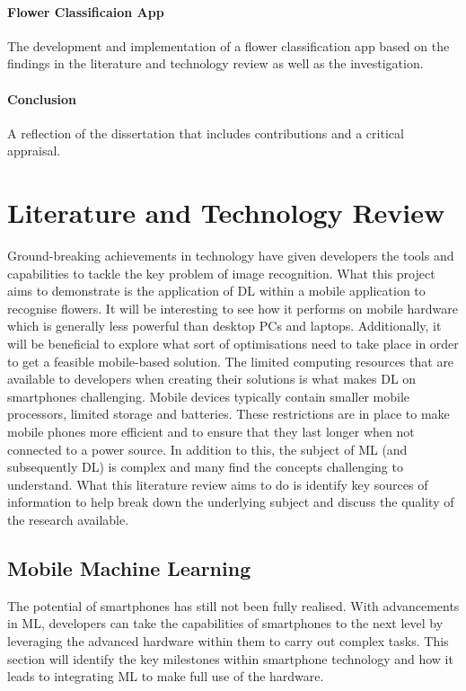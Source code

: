 \documentclass[12pt,a4paper]{report}
\begin{document}
\subsubsection*{Flower Classificaion App}
The development and implementation of a flower classification app based on the findings in the literature and 
technology review as well as the investigation.

\subsubsection*{Conclusion}
A reflection of the dissertation that includes contributions and a critical appraisal.

\clearpage
\chapter{Literature and Technology Review}

Ground-breaking achievements in technology have given developers the tools and capabilities to
tackle the key problem of image recognition. What this project aims to demonstrate is the application of DL 
within a mobile application to recognise flowers. It will be interesting to see how it performs on mobile 
hardware which is generally less powerful than desktop PCs and laptops. Additionally, it will be beneficial to explore 
what sort 
of optimisations need to take place in order to get a feasible mobile-based solution. The limited computing resources 
that are available to developers when creating their solutions is what makes DL on smartphones challenging. 
Mobile devices typically 
contain smaller mobile processors, limited storage and batteries. These restrictions are in place to 
make mobile phones more efficient and to ensure that they last longer when not connected to a power source. In addition
to this, the subject of ML (and subsequently DL) is complex and many find the concepts challenging to understand. 
What this literature review aims to do is identify key sources of information to help break down the underlying 
subject and discuss the quality of the research available.

\section{Mobile Machine Learning}

The potential of smartphones has still not been fully realised. With advancements in ML, developers can take the 
capabilities of smartphones to the next level by leveraging the advanced hardware within them to carry out complex 
tasks. This section will identify the key milestones within smartphone technology and how it leads to integrating 
ML to make full use of the hardware.
\end{document}
